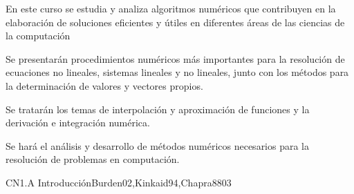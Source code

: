 
\begin{syllabus}


\begin{justification}
En este curso se estudia y analiza algoritmos numéricos que
contribuyen en la elaboración de soluciones eficientes y útiles en
diferentes áreas de las ciencias de la computación
\end{justification}

\begin{goals}
\item Se presentarán procedimientos numéricos más importantes para la resolución de 
ecuaciones no lineales, sistemas lineales y no lineales, junto con los métodos 
para la determinación de valores y vectores propios.

\item Se tratarán los temas de interpolación y aproximación de funciones y la 
derivación e integración numérica.

\item Se hará el análisis y desarrollo de métodos numéricos necesarios para la 
resolución de problemas en computación.
\end{goals}

\begin{outcomes}
\end{outcomes}

\begin{unit}{CN1.A Introducción}{Burden02,Kinkaid94,Chapra88}{0}{3}
\begin{topics}
      \item \CNONETopicFloating
      \item \CNONETopicError
      \item \CNONETopicTaylor
   \end{topics}

   \begin{learningoutcomes}
      \item \CNONEObjONE
      \item \CNONEObjTWO
      \item \CNONEObjTHREE
      \item \CNONEObjFOUR
   \end{learningoutcomes}
\end{unit}


\end{syllabus}
